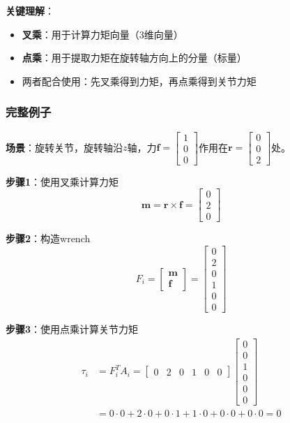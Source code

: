 \documentclass[12pt,a4paper]{article}
\begin{document}
\textbf{关键理解}：
\begin{itemize}
\item \textbf{叉乘}：用于计算力矩向量（3维向量）
\item \textbf{点乘}：用于提取力矩在旋转轴方向上的分量（标量）
\item 两者配合使用：先叉乘得到力矩，再点乘得到关节力矩
\end{itemize}

\subsubsection{完整例子}

\textbf{场景}：旋转关节，旋转轴沿$z$轴，力$\bm{f} = \begin{bmatrix} 1 \\ 0 \\ 0 \end{bmatrix}$作用在$\bm{r} = \begin{bmatrix} 0 \\ 0 \\ 2 \end{bmatrix}$处。

\textbf{步骤1}：使用叉乘计算力矩
\begin{equation}
\bm{m} = \bm{r} \times \bm{f} = \begin{bmatrix} 0 \\ 2 \\ 0 \end{bmatrix}
\end{equation}

\textbf{步骤2}：构造wrench
\begin{equation}
F_i = \begin{bmatrix} \bm{m} \\ \bm{f} \end{bmatrix} = \begin{bmatrix} 0 \\ 2 \\ 0 \\ 1 \\ 0 \\ 0 \end{bmatrix}
\end{equation}

\textbf{步骤3}：使用点乘计算关节力矩
\begin{align}
\tau_i &= F_i^T A_i = \begin{bmatrix} 0 & 2 & 0 & 1 & 0 & 0 \end{bmatrix} \begin{bmatrix} 0 \\ 0 \\ 1 \\ 0 \\ 0 \\ 0 \end{bmatrix} \\
&= 0 \cdot 0 + 2 \cdot 0 + 0 \cdot 1 + 1 \cdot 0 + 0 \cdot 0 + 0 \cdot 0 = 0
\end{align}
\end{document}
